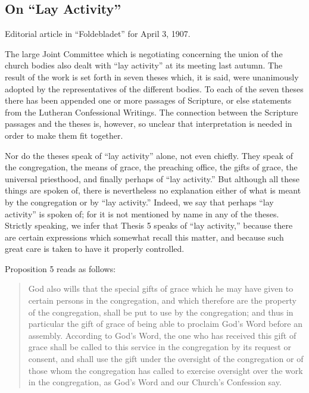 
\subsection{On “Lay Activity”}

Editorial article in “Foldebladet” for April 3, 1907.

The large Joint Committee which is negotiating concerning the union of the church bodies also dealt with “lay activity” at its meeting last autumn. The result of the work is set forth in seven theses which, it is said, were unanimously adopted by the representatives of the different bodies. To each of the seven theses there has been appended one or more passages of Scripture, or else statements from the Lutheran Confessional Writings. The connection between the Scripture passages and the theses is, however, so unclear that interpretation is needed in order to make them fit together.

Nor do the theses speak of “lay activity” alone, not even chiefly. They speak of the congregation, the means of grace, the preaching office, the gifts of grace, the universal priesthood, and finally perhaps of “lay activity.” But although all these things are spoken of, there is nevertheless no explanation either of what is meant by the congregation or by “lay activity.” Indeed, we say that perhaps “lay activity” is spoken of; for it is not mentioned by name in any of the theses. Strictly speaking, we infer that Thesis 5 speaks of “lay activity,” because there are certain expressions which somewhat recall this matter, and because such great care is taken to have it properly controlled.

Proposition 5 reads as follows:

\begin{quote}
God also wills that the special gifts of grace which he may have given to certain persons in the congregation, and which therefore are the property of the congregation, shall be put to use by the congregation; and thus in particular the gift of grace of being able to proclaim God’s Word before an assembly. According to God’s Word, the one who has received this gift of grace shall be called to this service in the congregation by its request or consent, and shall use the gift under the oversight of the congregation or of those whom the congregation has called to exercise oversight over the work in the congregation, as God’s Word and our Church’s Confession say.
\end{quote}

